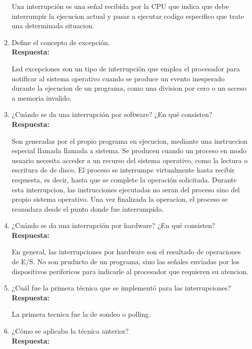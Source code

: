 \documentclass[a4paper,12pt]{article}
\begin{document}
\begin{enumerate}[label=\textbf{Pregunta \arabic*.}]
    Una interrupción es una señal recibida por la CPU que indica que debe interrumpir la ejecucion actual y pasar a ejecutar codigo especifico que trate una determinada situacion.  

    \item Define el concepto de excepción. \\
    \textbf{Respuesta:} 

    Lsd excepciones son un tipo de interrupción que emplea el procesador para notificar al sistema operativo cuando se produce un evento inesperado durante la ejecucion de un programa, como una division por cero o un acceso a memoria invalido.  
    

    \item ¿Cuándo se da una interrupción por software? ¿En qué consisten? \\
    \textbf{Respuesta:} 
    
    Son generadas por el propio programa en ejecucion, mediante una instruccion especial llamada llamada a sistema. Se producen cuando un proceso en modo usuario necesita acceder a un recurso del sistema operativo, como la lectura o escritura de de disco. El proceso se interrumpe virtualmente hasta recibir respuesta, es decir, hasta que se complete la operación solicitada. Durante esta interrupcion, las instrucciones ejecutadas no seran del proceso sino del propio sistema operativo. Una vez finalizada la operacion, el proceso se reanudara desde el punto donde fue interrumpido.


    \item ¿Cuándo se da una interrupción por hardware? ¿En qué consisten? \\
    \textbf{Respuesta:} 
    

    En general, las interrupciones por hardware son el resultado de operaciones de E/S. No son pruducto de un programa, sino las señales enviadas por los dispositivos perifericos para indicarle al procesador que requieren su atencion. 





    \item ¿Cuál fue la primera técnica que se implementó para las interrupciones? \\
    \textbf{Respuesta:} 
    
    La primera tecnica fue la de sondeo o polling. 

    \item ¿Cómo se aplicaba la técnica anterior? \\
    \textbf{Respuesta:} 



\end{enumerate}
\end{document}
